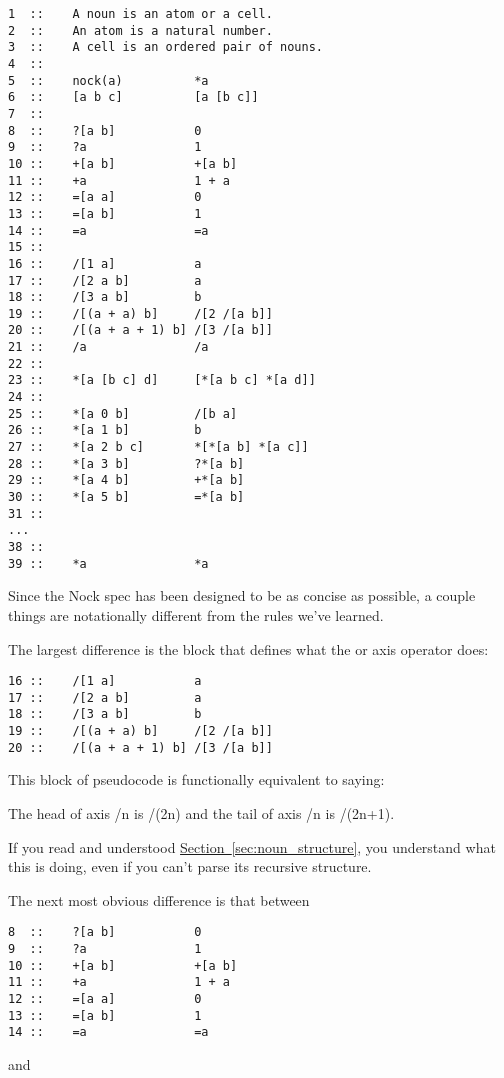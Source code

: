 \begin{framed_shaded}
\begin{Verbatim}[fontsize=\relsize{-2.5},commandchars=\\\{\}]
1  ::    A noun is an atom or a cell.
2  ::    An atom is a natural number.
3  ::    A cell is an ordered pair of nouns.
4  ::
5  ::    nock(a)          *a
6  ::    [a b c]          [a [b c]]
7  ::
8  ::    ?[a b]           0
9  ::    ?a               1
10 ::    +[a b]           +[a b]
11 ::    +a               1 + a
12 ::    =[a a]           0
13 ::    =[a b]           1
14 ::    =a               =a
15 ::
16 ::    /[1 a]           a
17 ::    /[2 a b]         a
18 ::    /[3 a b]         b
19 ::    /[(a + a) b]     /[2 /[a b]]
20 ::    /[(a + a + 1) b] /[3 /[a b]]
21 ::    /a               /a
22 ::
23 ::    *[a [b c] d]     [*[a b c] *[a d]]
24 ::
25 ::    *[a 0 b]         /[b a]
26 ::    *[a 1 b]         b
27 ::    *[a 2 b c]       *[*[a b] *[a c]]
28 ::    *[a 3 b]         ?*[a b]
29 ::    *[a 4 b]         +*[a b]
30 ::    *[a 5 b]         =*[a b]
31 ::
...
38 ::
39 ::    *a               *a
\end{Verbatim}
\end{framed_shaded}

Since the Nock spec has been designed to be as concise as possible, a couple things are notationally different from the rules we've learned.

The largest difference is the block that defines what the \kode{/} or axis operator does:

\begin{framed_shaded}
\begin{Verbatim}[fontsize=\relsize{-2.5},commandchars=\\\{\}]
16 ::    /[1 a]           a
17 ::    /[2 a b]         a
18 ::    /[3 a b]         b
19 ::    /[(a + a) b]     /[2 /[a b]]
20 ::    /[(a + a + 1) b] /[3 /[a b]]
\end{Verbatim}
\end{framed_shaded}
This block of pseudocode is functionally equivalent to saying:

The head of axis /n is /(2n) and the tail of axis /n is /(2n+1).

If you read and understood \hyperref[sec:noun_structure]{Section~\ref{sec:noun_structure}}, you understand what this is doing, even if you can't parse its recursive structure.

The next most obvious difference is that between

\begin{framed_shaded}
\begin{Verbatim}[fontsize=\relsize{-2.5},commandchars=\\\{\}]
8  ::    ?[a b]           0
9  ::    ?a               1
10 ::    +[a b]           +[a b]
11 ::    +a               1 + a
12 ::    =[a a]           0
13 ::    =[a b]           1
14 ::    =a               =a
\end{Verbatim}
\end{framed_shaded}
and

